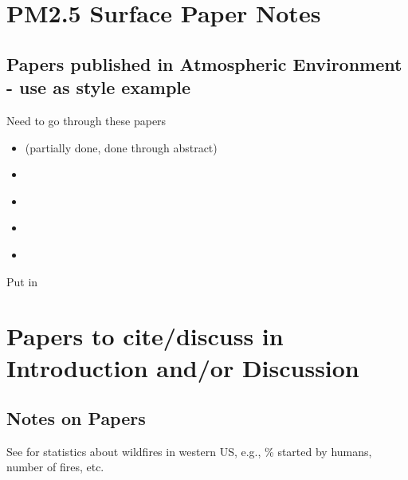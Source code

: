 \section{PM2.5 Surface Paper Notes}

\subsection{Papers published in Atmospheric Environment - use as style example}

Need to go through these papers
\begin{itemize}
\item \cite{BrokampExposure2017} (partially done, done through abstract)
\item \cite{Sampson2013}
\item \cite{Anyenda2016}
\item \cite{Torvela2014}
\item \cite{Whiteman2014}
\end{itemize}

Put in \cite{BrokampExposure2017,larsen_impacts_2017}

\section{Papers to cite/discuss in Introduction and/or Discussion}

\cite{westerling_increasing_2016,WesterlingCorrection2016}

\subsection{Notes on Papers}

See \cite{Fusco2016} for statistics about wildfires in western US, e.g., \% started by humans, number of fires, etc.
